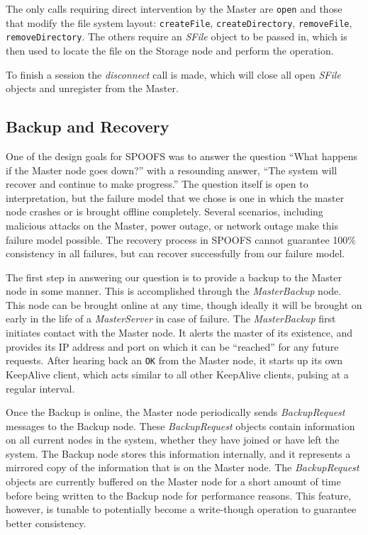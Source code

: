 The only calls requiring direct intervention by the Master are \texttt{open} and those that modify the file system layout: \texttt{createFile}, \texttt{createDirectory}, \texttt{removeFile}, \texttt{removeDirectory}. The others require an \textit{SFile} object to be passed in, which is then used to locate the file on the Storage node and perform the operation.

To finish a session the \textit{disconnect} call is made, which will close all open \textit{SFile} objects and unregister from the Master.

\subsection{Backup and Recovery}

One of the design goals for SPOOFS was to answer the question ``What happens if the Master node goes down?'' with a resounding answer, ``The system will recover and continue to make progress.''  The question itself is open to interpretation, but the failure model that we chose is one in which the master node crashes or is brought offline completely.  Several scenarios, including malicious attacks on the Master, power outage, or network outage make this failure model possible.  The recovery process in SPOOFS cannot guarantee 100\% consistency in all failures, but can recover successfully from our failure model.

The first step in answering our question is to provide a backup to the Master node in some manner.  This is accomplished through the \textit{MasterBackup} node.  This node can be brought online at any time, though ideally it will be brought on early in the life of a \textit{MasterServer} in case of failure.  The \textit{MasterBackup} first initiates contact with the Master node.  It alerts the master of its existence, and provides its IP address and port on which it can be ``reached'' for any future requests.  After hearing back an \texttt{OK} from the Master node, it starts up its own KeepAlive client, which acts similar to all other KeepAlive clients, pulsing at a regular interval.

Once the Backup is online, the Master node periodically sends \textit{BackupRequest} messages to the Backup node.  These \textit{BackupRequest} objects contain information on all current nodes in the system, whether they have joined or have left the system.  The Backup node stores this information internally, and it represents a mirrored copy of the information that is on the Master node.  The \textit{BackupRequest} objects are currently buffered on the Master node for a short amount of time before being written to the Backup node for performance reasons.  This feature, however, is tunable to potentially become a write-though operation to guarantee better consistency.

